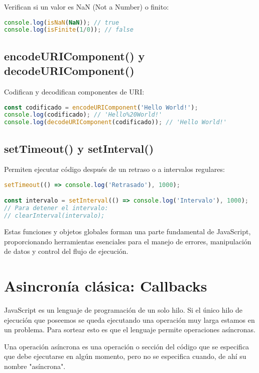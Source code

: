 \documentclass{book}
\begin{document}
Verifican si un valor es NaN (Not a Number) o finito:

\begin{lstlisting}[language=JavaScript]
console.log(isNaN(NaN)); // true
console.log(isFinite(1/0)); // false
\end{lstlisting}

\subsection{encodeURIComponent() y decodeURIComponent()}

Codifican y decodifican componentes de URI:

\begin{lstlisting}[language=JavaScript]
const codificado = encodeURIComponent('Hello World!');
console.log(codificado); // 'Hello%20World!'
console.log(decodeURIComponent(codificado)); // 'Hello World!'
\end{lstlisting}

\subsection{setTimeout() y setInterval()}

Permiten ejecutar código después de un retraso o a intervalos regulares:

\begin{lstlisting}[language=JavaScript]
setTimeout(() => console.log('Retrasado'), 1000);

const intervalo = setInterval(() => console.log('Intervalo'), 1000);
// Para detener el intervalo:
// clearInterval(intervalo);
\end{lstlisting}

Estas funciones y objetos globales forman una parte fundamental de JavaScript, proporcionando herramientas esenciales para el manejo de errores, manipulación de datos y control del flujo de ejecución.

\section{Asincronía clásica: Callbacks}

JavaScript es un lenguaje de programación de un solo hilo. Si el único hilo de ejecución que poseemos se queda ejecutando una operación muy larga estamos en un problema.
Para sortear esto es que el lenguaje permite operaciones asíncronas. 

Una operación asíncrona es una operación o sección del código que se especifica que debe ejecutarse en algún momento, pero no se especifica cuando, de ahí su nombre "asíncrona".
\end{document}

